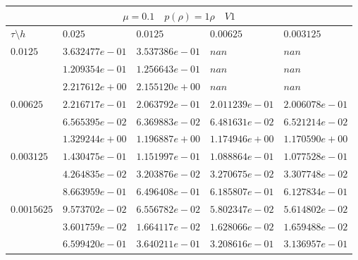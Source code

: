 \documentclass[a4paper,12pt]{extarticle}
\begin{document}
\begin{tabular}{|l|l|l|l|l|}
	\hline
	\multicolumn{5}{|c|}{$\mu =0.1 \quad  p(\rho) =1 \rho \quad V1$}\\
	\hline
	$\tau\setminus h$ & $0.025$ & $0.0125$ & $0.00625$ & $0.003125$\\
	\hline
	$0.0125$  & $3.632477e-01$ & $3.537386e-01$ & $nan$ & $nan$\\
	& $1.209354e-01$ & $1.256643e-01$ & $nan$ & $nan$\\
	& $2.217612e+00$ & $2.155120e+00$ & $nan$ & $nan$\\
	\hline
	$0.00625$  & $2.216717e-01$ & $2.063792e-01$ & $2.011239e-01$ & $2.006078e-01$\\
	& $6.565395e-02$ & $6.369883e-02$ & $6.481631e-02$ & $6.521214e-02$\\
	& $1.329244e+00$ & $1.196887e+00$ & $1.174946e+00$ & $1.170590e+00$\\
	\hline
	$0.003125$  & $1.430475e-01$ & $1.151997e-01$ & $1.088864e-01$ & $1.077528e-01$\\
	& $4.264835e-02$ & $3.203876e-02$ & $3.270675e-02$ & $3.307748e-02$\\
	& $8.663959e-01$ & $6.496408e-01$ & $6.185807e-01$ & $6.127834e-01$\\
	\hline
	$0.0015625$  & $9.573702e-02$ & $6.556782e-02$ & $5.802347e-02$ & $5.614802e-02$\\
	& $3.601759e-02$ & $1.664117e-02$ & $1.628066e-02$ & $1.659488e-02$\\
	& $6.599420e-01$ & $3.640211e-01$ & $3.208616e-01$ & $3.136957e-01$\\
	\hline
\end{tabular}
\end{document}
